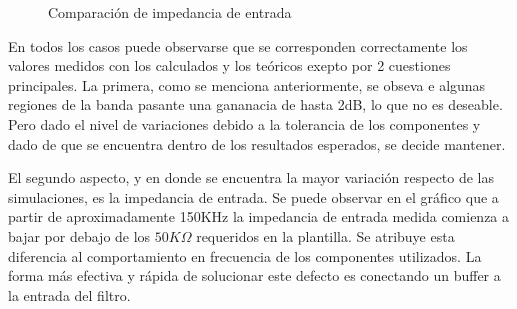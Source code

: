 \begin{figure}[H]
    \centering
    \caption{Comparaci\'on de impedancia de entrada}
    \label{fig:ZIN}
\end{figure}
En todos los casos puede observarse que se corresponden correctamente los valores medidos con los calculados y los te\'oricos exepto por 2 cuestiones principales. La primera, como se menciona anteriormente, se obseva e algunas regiones de la banda pasante una gananacia de hasta 2dB, lo que no es deseable. Pero dado el nivel de variaciones debido a la tolerancia de los componentes y dado de que se encuentra dentro de los resultados esperados, se decide mantener.

El segundo aspecto, y en donde se encuentra la mayor variaci\'on respecto de las simulaciones, es la impedancia de entrada. Se puede observar en el gr\'afico que a partir de aproximadamente 150KHz la impedancia de entrada medida comienza a bajar por debajo de los $50K\Omega$ requeridos en la plantilla. Se atribuye esta diferencia al comportamiento en frecuencia de los componentes utilizados. La forma m\'as efectiva y r\'apida de solucionar este defecto es conectando un buffer a la entrada del filtro.


